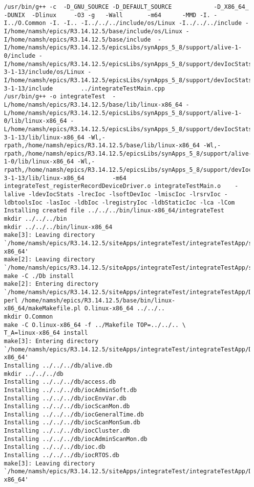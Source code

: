 \documentclass[11pt
  , a4paper
  , article
  , oneside
]{memoir}
\begin{document}
\begin{lstlisting}[style=termstyle]
/usr/bin/g++ -c  -D_GNU_SOURCE -D_DEFAULT_SOURCE            -D_X86_64_  -DUNIX  -Dlinux     -O3 -g   -Wall       -m64      -MMD -I. -I../O.Common -I. -I.. -I../../../include/os/Linux -I../../../include -I/home/namsh/epics/R3.14.12.5/base/include/os/Linux -I/home/namsh/epics/R3.14.12.5/base/include  -I/home/namsh/epics/R3.14.12.5/epicsLibs/synApps_5_8/support/alive-1-0/include -I/home/namsh/epics/R3.14.12.5/epicsLibs/synApps_5_8/support/devIocStats-3-1-13/include/os/Linux -I/home/namsh/epics/R3.14.12.5/epicsLibs/synApps_5_8/support/devIocStats-3-1-13/include        ../integrateTestMain.cpp 
/usr/bin/g++ -o integrateTest  -L/home/namsh/epics/R3.14.12.5/base/lib/linux-x86_64 -L/home/namsh/epics/R3.14.12.5/epicsLibs/synApps_5_8/support/alive-1-0/lib/linux-x86_64 -L/home/namsh/epics/R3.14.12.5/epicsLibs/synApps_5_8/support/devIocStats-3-1-13/lib/linux-x86_64 -Wl,-rpath,/home/namsh/epics/R3.14.12.5/base/lib/linux-x86_64 -Wl,-rpath,/home/namsh/epics/R3.14.12.5/epicsLibs/synApps_5_8/support/alive-1-0/lib/linux-x86_64 -Wl,-rpath,/home/namsh/epics/R3.14.12.5/epicsLibs/synApps_5_8/support/devIocStats-3-1-13/lib/linux-x86_64        -m64               integrateTest_registerRecordDeviceDriver.o integrateTestMain.o    -lalive -ldevIocStats -lrecIoc -lsoftDevIoc -lmiscIoc -lrsrvIoc -ldbtoolsIoc -lasIoc -ldbIoc -lregistryIoc -ldbStaticIoc -lca -lCom   
Installing created file ../../../bin/linux-x86_64/integrateTest
mkdir ../../../bin
mkdir ../../../bin/linux-x86_64
make[3]: Leaving directory `/home/namsh/epics/R3.14.12.5/siteApps/integrateTest/integrateTestApp/src/O.linux-x86_64'
make[2]: Leaving directory `/home/namsh/epics/R3.14.12.5/siteApps/integrateTest/integrateTestApp/src'
make -C ./Db install 
make[2]: Entering directory `/home/namsh/epics/R3.14.12.5/siteApps/integrateTest/integrateTestApp/Db'
perl /home/namsh/epics/R3.14.12.5/base/bin/linux-x86_64/makeMakefile.pl O.linux-x86_64 ../../..
mkdir O.Common
make -C O.linux-x86_64 -f ../Makefile TOP=../../.. \
T_A=linux-x86_64 install
make[3]: Entering directory `/home/namsh/epics/R3.14.12.5/siteApps/integrateTest/integrateTestApp/Db/O.linux-x86_64'
Installing ../../../db/alive.db
mkdir ../../../db
Installing ../../../db/access.db
Installing ../../../db/iocAdminSoft.db
Installing ../../../db/iocEnvVar.db
Installing ../../../db/iocScanMon.db
Installing ../../../db/iocGeneralTime.db
Installing ../../../db/iocScanMonSum.db
Installing ../../../db/iocCluster.db
Installing ../../../db/iocAdminScanMon.db
Installing ../../../db/ioc.db
Installing ../../../db/iocRTOS.db
make[3]: Leaving directory `/home/namsh/epics/R3.14.12.5/siteApps/integrateTest/integrateTestApp/Db/O.linux-x86_64'

\end{lstlisting}
\end{document}
